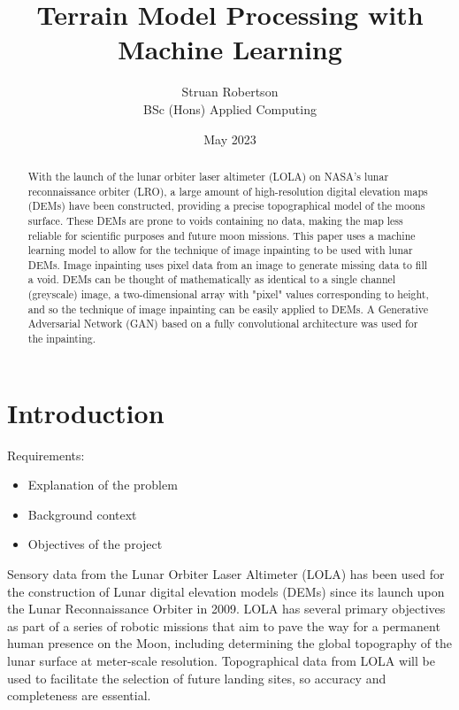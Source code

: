 \documentclass[twocolumn]{article}
\author{Struan Robertson \\ BSc (Hons) Applied Computing}
\date{May 2023}
\title{Terrain Model Processing with Machine Learning}
\begin{document}
\maketitle
\begin{abstract}

With the launch of the lunar orbiter laser altimeter (LOLA) on NASA's lunar reconnaissance orbiter (LRO), a large amount of high-resolution digital elevation maps (DEMs) have been constructed, providing a precise topographical model of the moons surface.
These DEMs are prone to voids containing no data, making the map less reliable for scientific purposes and future moon missions.
This paper uses a machine learning model to allow for the technique of image inpainting to be used with lunar DEMs.
Image inpainting uses pixel data from an image to generate missing data to fill a void.
DEMs can be thought of mathematically as identical to a single channel (greyscale) image, a two-dimensional array with "pixel" values corresponding to height, and so the technique of image inpainting can be easily applied to DEMs.
A Generative Adversarial Network (GAN) based on a fully convolutional architecture was used for the inpainting.


\end{abstract}

\section{Introduction}
\label{sec:org655e49c}

Requirements:
\begin{itemize}
\item Explanation of the problem
\item Background context
\item Objectives of the project
\end{itemize}

Sensory data from the Lunar Orbiter Laser Altimeter (LOLA) has been used for the construction of Lunar digital elevation models (DEMs) since its launch upon the Lunar Reconnaissance Orbiter in 2009.
LOLA has several primary objectives as part of a series of robotic missions that aim to pave the way for a permanent human presence on the Moon, including determining the global topography of the lunar surface at meter-scale resolution.
Topographical data from LOLA will be used to facilitate the selection of future landing sites, so accuracy and completeness are essential.
\autocite{chinLunarReconnaissanceOrbiter2007}
\end{document}
